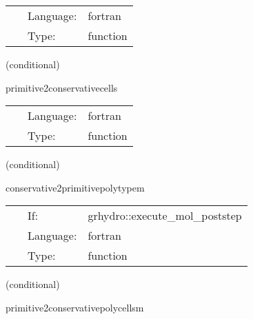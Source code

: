 \documentclass{article}
\begin{document}
\hspace{5mm}

 \begin{tabular*}{160mm}{cll} 
~ & Language:  & fortran \\ 
~ & Type:  & function \\ 
\end{tabular*} 


\vspace{5mm}

   (conditional) 

\hspace{5mm} primitive2conservativecells 

\hspace{5mm}{\it convert initial data given in primive variables to conserved variables } 


\hspace{5mm}

 \begin{tabular*}{160mm}{cll} 
~ & Language:  & fortran \\ 
~ & Type:  & function \\ 
\end{tabular*} 


\vspace{5mm}

   (conditional) 

\hspace{5mm} conservative2primitivepolytypem 

\hspace{5mm}{\it convert back to primitive variables (polytype) - mhd version } 


\hspace{5mm}

 \begin{tabular*}{160mm}{cll} 
~ & If:  & grhydro::execute\_mol\_poststep \\ 
~ & Language:  & fortran \\ 
~ & Type:  & function \\ 
\end{tabular*} 


\vspace{5mm}

   (conditional) 

\hspace{5mm} primitive2conservativepolycellsm 

\hspace{5mm}{\it convert initial data given in primive variables to conserved variables - mhd version } 
\end{document}
